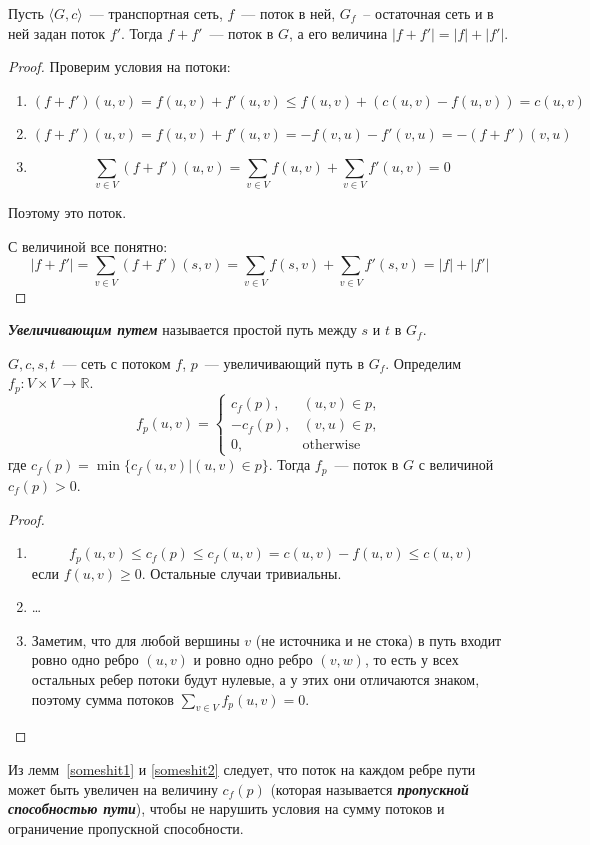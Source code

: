 \begin{lemma}\label{someshit1} %
	Пусть $\langle G,c\rangle$~--- транспортная сеть, $f$~--- поток в ней, $G_f$~-- остаточная сеть и в ней задан поток $f'$. Тогда $f+f'$~--- поток в $G$, а его величина $|f+f'|=|f|+|f'|$.
\end{lemma}
\begin{proof}
	Проверим условия на потоки:
	\begin{enumerate}
		\item $$(f+f')(u,v)=f(u,v)+f'(u,v)\le f(u,v)+(c(u,v)-f(u,v))=c(u,v)$$
		\item $$(f+f')(u,v)=f(u,v)+f'(u,v)=-f(v,u)-f'(v,u)=-(f+f')(v,u)$$
		\item $$\sum_{v\in V}(f+f')(u,v)=\sum_{v\in V}f(u,v)+\sum_{v\in V}f'(u,v)=0$$
	\end{enumerate}
	Поэтому это поток.

	С величиной все понятно:
	$$|f+f'|=\sum_{v\in V}(f+f')(s,v)=\sum_{v\in V}f(s,v)+\sum_{v\in V}f'(s,v)=|f|+|f'|$$
\end{proof}
\begin{definition}
	{\bf\it Увеличивающим путем} называется простой путь между $s$ и $t$ в $G_f$.
\end{definition}
\begin{lemma}\label{someshit2}
	$G,c,s,t$~--- сеть с потоком $f$, $p$~--- увеличивающий путь в $G_f$. Определим $f_p\colon V\times V\to\mathbb{R}$.
	$$
	f_p(u,v)=
	\begin{cases}
		c_f(p), & (u,v)\in p,\\
		-c_f(p), & (v,u)\in p,\\
		0, & \mathrm{otherwise}
	\end{cases}
	$$
	где $c_f(p)=\min\{c_f(u,v)|(u,v)\in p\}$.
	Тогда $f_p$~--- поток в $G$ с величиной $c_f(p)>0$.
\end{lemma}
\begin{proof}$ $\newline
	\begin{enumerate}
		\item $$f_p(u,v)\le c_f(p)\le c_f(u,v)=c(u,v)-f(u,v)\le c(u,v)$$ если $f(u,v)\ge 0$. Остальные случаи тривиальны.
		\item \ldots
		\item Заметим, что для любой вершины $v$ (не источника и не стока) в путь входит ровно одно ребро $(u,v)$ и ровно одно ребро $(v,w)$, то есть у всех остальных ребер потоки будут нулевые, а у этих они отличаются знаком, поэтому сумма потоков  $\sum_{v\in V}f_p(u,v)=0$.
	\end{enumerate}
\end{proof}
Из лемм~\ref{someshit1} и \ref{someshit2} следует, что поток на каждом ребре пути может быть увеличен на величину $c_f(p)$ (которая называется {\bf\it пропускной способностью пути}), чтобы не нарушить условия на сумму потоков и ограничение пропускной способности.

